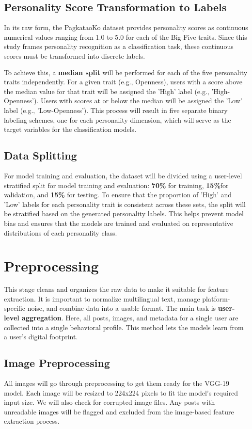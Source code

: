 \subsection{Personality Score Transformation to Labels}
In its raw form, the PagkataoKo dataset provides personality scores as continuous numerical values ranging from 1.0 to 5.0 for each of the Big Five traits. Since this study frames personality recognition as a classification task, these continuous scores must be transformed into discrete labels.

To achieve this, a \textbf{median split} will be performed for each of the five personality traits independently. For a given trait (e.g., Openness), users with a score above the median value for that trait will be assigned the 'High' label (e.g., 'High-Openness'). Users with scores at or below the median will be assigned the 'Low' label (e.g., 'Low-Openness'). This process will result in five separate binary labeling schemes, one for each personality dimension, which will serve as the target variables for the classification models.

\subsection{Data Splitting}
For model training and evaluation, the dataset will be divided using a user-level stratified split for model training and evaluation: \textbf{70\%} for training, \textbf{15\%}for validation, and \textbf{15\%} for testing. To ensure that the proportion of 'High' and 'Low' labels for each personality trait is consistent across these sets, the split will be stratified based on the generated personality labels. This helps prevent model bias and ensures that the models are trained and evaluated on representative distributions of each personality class.

\section{Preprocessing}
This stage cleans and organizes the raw data to make it suitable for feature extraction. It is important to normalize multilingual text, manage platform-specific noise, and combine data into a usable format. The main task is \textbf{user-level aggregation}. Here, all posts, images, and metadata for a single user are collected into a single behavioral profile. This method lets the models learn from a user's digital footprint.

\subsection{Image Preprocessing}
All images will go through preprocessing to get them ready for the VGG-19 model. Each image will be resized to 224x224 pixels to fit the model’s required input size. We will also check for corrupted image files. Any posts with unreadable images will be flagged and excluded from the image-based feature extraction process.  

